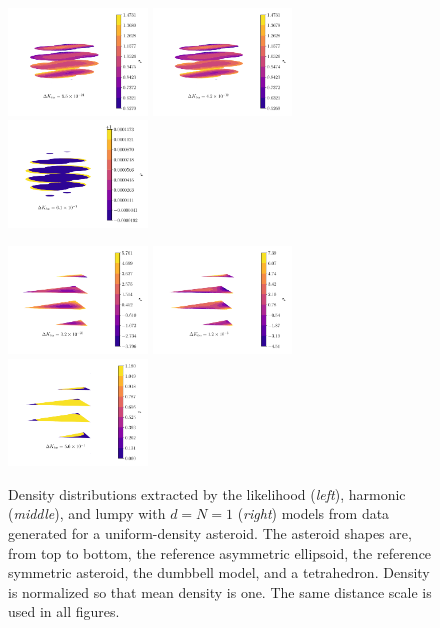 \documentclass[fleqn,usenatbib]{mnras}
\begin{document}
\begin{figure}
  \includegraphics[width=0.33\textwidth]{figs/db-likelihood.pdf}\hfill
  \includegraphics[width=0.33\textwidth]{figs/db-harmonic.pdf}\hfill
  \includegraphics[width=0.33\textwidth]{figs/db-lumpy.pdf}

  \includegraphics[width=0.33\textwidth]{figs/tet-likelihood.pdf}\hfill
  \includegraphics[width=0.33\textwidth]{figs/tet-harmonic.pdf}\hfill
  \includegraphics[width=0.33\textwidth]{figs/tet-lumpy.pdf}
  \caption{Density distributions extracted by the likelihood (\textit{left}), harmonic (\textit{middle}), and lumpy with $d=N=1$ (\textit{right}) models from data generated for a uniform-density asteroid. The asteroid shapes are, from top to bottom, the reference asymmetric ellipsoid, the reference symmetric asteroid, the dumbbell model, and a tetrahedron. Density is normalized so that mean density is one. The same distance scale is used in all figures.}
  \label{fig:uniform-density}
\end{figure}
\end{document}
